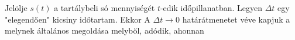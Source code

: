 Jelölje $s(t)$ a tartálybeli só mennyiségét $t$-edik időpillanatban. Legyen $\Delta t$
egy "elegendően" kicsiny időtartam. Ekkor
A $\Delta t \to 0$ határátmenetet véve kapjuk a
 melynek általános megoldása
melyből,
adódik, ahonnan
